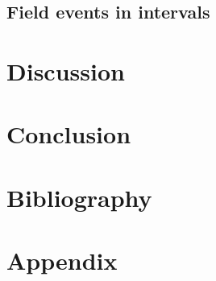 \documentclass[a4paper,11pt]{article}
\begin{document}
\subsection{Field events in intervals}

\section{Discussion}

\section{Conclusion}



\newpage
\section{Bibliography}



\newpage
\section{Appendix}




\newpage

\end{document}
